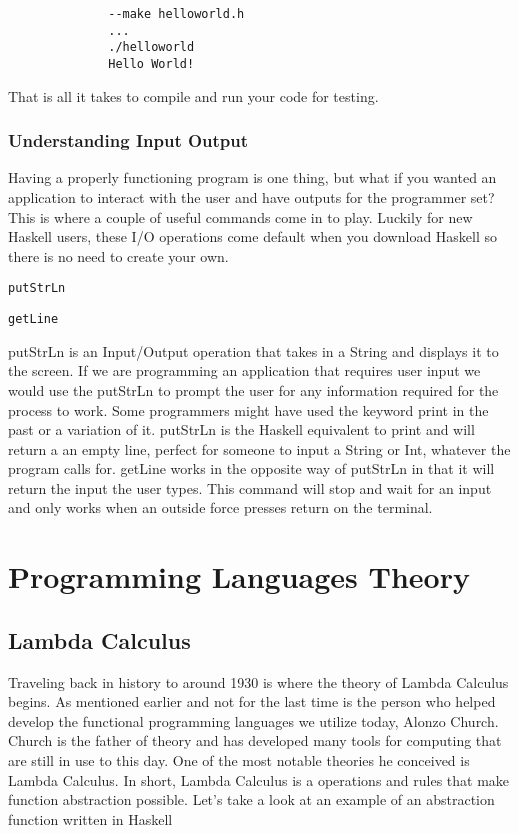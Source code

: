 \documentclass{article}
\begin{document}
    \begin{lstlisting}
              --make helloworld.h
              ...
              ./helloworld
              Hello World!
    \end{lstlisting}
    
    \noindent That is all it takes to compile and run your code for testing.
    
    \medskip
    \subsubsection{Understanding Input Output}
    Having a properly functioning program is one thing, but what if you wanted an application to interact with the user and have outputs for the programmer set? This is where a couple of useful commands come in to play. Luckily for new Haskell users, these I/O operations come default when you download Haskell so there is no need to create your own.  
    
    \lstinline{putStrLn}
    
    \smallskip
    \lstinline{getLine}
    
    \noindent putStrLn is an Input/Output operation that takes in a String and displays it to the screen. If we are programming an application that requires user input we would use the putStrLn to prompt the user for any information required for the process to work. Some programmers might have used the keyword print in the past or a variation of it. putStrLn is the Haskell equivalent to print and will return a an empty line, perfect for someone to input a String or Int, whatever the program calls for. getLine works in the opposite way of putStrLn in that it will return the input the user types. This command will stop and wait for an input and only works when an outside force presses return on the terminal.

\section{Programming Languages Theory}
    \subsection{Lambda Calculus}
    Traveling back in history to around 1930 is where the theory of Lambda Calculus begins. As mentioned earlier and not for the last time is the person who helped develop the functional programming languages we utilize today, Alonzo Church. Church is the father of theory and has developed many tools for computing that are still in use to this day. One of the most notable theories he conceived is Lambda Calculus. In short, Lambda Calculus is a operations and rules that make function abstraction possible. Let's take a look at an example of an abstraction function written in Haskell
    
\end{document}
